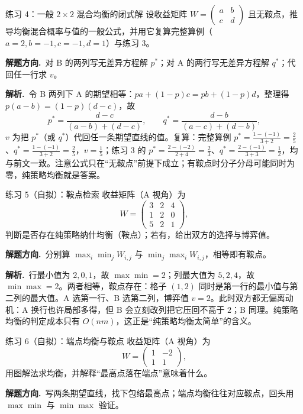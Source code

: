 \documentclass[UTF8,a4paper,11pt,oneside,openany,fontset=fandol]{ctexbook}
\theoremstyle{definition}
\newcommand{\sol}{\par\noindent\textbf{解析.}\ }
\newcommand{\hint}{\par\noindent\textbf{解题方向.}\ }
\begin{document}
\begin{problem}{练习 4：一般 $2\times2$ 混合均衡的闭式解}
设收益矩阵 $W=\begin{pmatrix}a&b\\ c&d\end{pmatrix}$ 且无鞍点，推导均衡混合概率与值的一般公式，并用它复算完整算例（$a=2,b=-1,c=-1,d=1$）与练习 3。
\end{problem}

\hint 对 B 的两列写无差异方程解 $p^{*}$；对 A 的两行写无差异方程解 $q^{*}$；代回任一行求 $v$。

\sol 令 B 两列下 A 的期望相等：$pa+(1-p)c=pb+(1-p)d$，整理得 $p(a-b)=(1-p)(d-c)$，故
\[
 p^{*}=\frac{d-c}{(a-b)+(d-c)},\qquad
 q^{*}=\frac{d-b}{(a-c)+(d-b)},
\]
$v$ 为把 $p^{*}$（或 $q^{*}$）代回任一条期望直线的值。复算：完整算例 $p^{*}=\tfrac{1-(-1)}{3+2}=\tfrac25$、$q^{*}=\tfrac{1-(-1)}{3+2}=\tfrac25$，$v=\tfrac15$；练习 3 的 $p^{*}=\tfrac{2-(-2)}{2+4}=\tfrac23$、$q^{*}=\tfrac{2-(-1)}{3+3}=\tfrac12$，均与前文一致。注意公式只在“无鞍点”前提下成立；有鞍点时分子分母可能同时为零，纯策略均衡就是答案。

\begin{problem}{练习 5（自拟）：鞍点检索}
收益矩阵（A 视角）为
\[
 W=\begin{pmatrix}3&2&4\\1&2&0\\5&2&1\end{pmatrix},
\]
判断是否存在纯策略纳什均衡（鞍点）；若有，给出双方的选择与博弈值。
\end{problem}

\hint 分别算 $\max_i\min_j W_{i,j}$ 与 $\min_j\max_i W_{i,j}$，相等即有鞍点。

\sol 行最小值为 $2,0,1$，故 $\max\min=2$；列最大值为 $5,2,4$，故 $\min\max=2$。两者相等，鞍点存在：格子 $(1,2)$ 同时是第一行的最小值与第二列的最大值。A 选第一行、B 选第二列，博弈值 $v=2$。此时双方都无偏离动机：A 换行也许局部多得，但 B 会立刻改列把它压回不高于 $2$；B 同理。纯策略均衡的判定成本只有 $O(nm)$，这正是“纯策略均衡太简单”的含义。

\begin{problem}{练习 6（自拟）：端点均衡与鞍点}
收益矩阵（A 视角）为
\[
 W=\begin{pmatrix}1&-2\\1&1\end{pmatrix},
\]
用图解法求均衡，并解释“最高点落在端点”意味着什么。
\end{problem}

\hint 写两条期望直线，找下包络最高点；端点均衡往往对应鞍点，回头用 $\max\min$ 与 $\min\max$ 验证。
\end{document}
